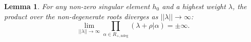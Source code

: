 \documentclass[11pt, a4paper]{article}
\newtheorem{lemma}[theorem]{Lemma}
\theoremstyle{definition}
\theoremstyle{remark}
\begin{document}
\begin{lemma}
\label{lemma:divergence}
For any non-zero singular element $h_0$ and a highest weight $\lambda$, the product over the non-degenerate roots diverges as $||\lambda|| \to \infty$:
\[
\lim_{||\lambda|| \to \infty} \prod_{\alpha \in R_{+, \text{ndeg}}} (\lambda+\rho|\alpha) = \pm \infty.
\]
\end{lemma}




\end{document}
